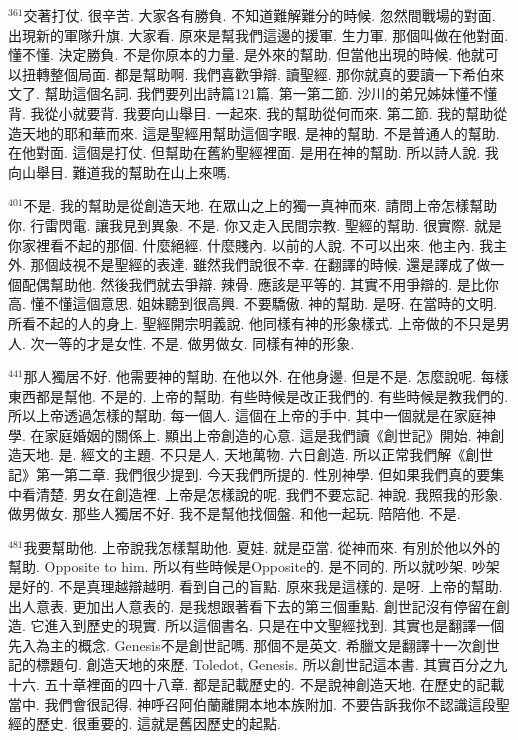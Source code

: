 \documentclass{book}
\begin{document}
$^{361}$交著打仗.
很辛苦.
大家各有勝負.
不知道難解難分的時候.
忽然間戰場的對面.
出現新的軍隊升旗.
大家看.
原來是幫我們這邊的援軍.
生力軍.
那個叫做在他對面.
懂不懂.
決定勝負.
不是你原本的力量.
是外來的幫助.
但當他出現的時候.
他就可以扭轉整個局面.
都是幫助啊.
我們喜歡爭辯.
讀聖經.
那你就真的要讀一下希伯來文了.
幫助這個名詞.
我們要列出詩篇121篇.
第一第二節.
沙川的弟兄姊妹懂不懂背.
我從小就要背.
我要向山舉目.
一起來.
我的幫助從何而來.
第二節.
我的幫助從造天地的耶和華而來.
這是聖經用幫助這個字眼.
是神的幫助.
不是普通人的幫助.
在他對面.
這個是打仗.
但幫助在舊約聖經裡面.
是用在神的幫助.
所以詩人說.
我向山舉目.
難道我的幫助在山上來嗎.

$^{401}$不是.
我的幫助是從創造天地.
在眾山之上的獨一真神而來.
請問上帝怎樣幫助你.
行雷閃電.
讓我見到異象.
不是.
你又走入民間宗教.
聖經的幫助.
很實際.
就是你家裡看不起的那個.
什麼絕經.
什麼賤內.
以前的人說.
不可以出來.
他主內.
我主外.
那個歧視不是聖經的表達.
雖然我們說很不幸.
在翻譯的時候.
還是譯成了做一個配偶幫助他.
然後我們就去爭辯.
辣骨.
應該是平等的.
其實不用爭辯的.
是比你高.
懂不懂這個意思.
姐妹聽到很高興.
不要驕傲.
神的幫助.
是呀.
在當時的文明.
所看不起的人的身上.
聖經開宗明義說.
他同樣有神的形象樣式.
上帝做的不只是男人.
次一等的才是女性.
不是.
做男做女.
同樣有神的形象.

$^{441}$那人獨居不好.
他需要神的幫助.
在他以外.
在他身邊.
但是不是.
怎麼說呢.
每樣東西都是幫他.
不是的.
上帝的幫助.
有些時候是改正我們的.
有些時候是教我們的.
所以上帝透過怎樣的幫助.
每一個人.
這個在上帝的手中.
其中一個就是在家庭神學.
在家庭婚姻的關係上.
顯出上帝創造的心意.
這是我們讀《創世記》開始.
神創造天地.
是.
經文的主題.
不只是人.
天地萬物.
六日創造.
所以正常我們解《創世記》第一第二章.
我們很少提到.
今天我們所提的.
性別神學.
但如果我們真的要集中看清楚.
男女在創造裡.
上帝是怎樣說的呢.
我們不要忘記.
神說.
我照我的形象.
做男做女.
那些人獨居不好.
我不是幫他找個盤.
和他一起玩.
陪陪他.
不是.

$^{481}$我要幫助他.
上帝說我怎樣幫助他.
夏娃.
就是亞當.
從神而來.
有別於他以外的幫助.
Opposite to him.
所以有些時候是Opposite的.
是不同的.
所以就吵架.
吵架是好的.
不是真理越辯越明.
看到自己的盲點.
原來我是這樣的.
是呀.
上帝的幫助.
出人意表.
更加出人意表的.
是我想跟著看下去的第三個重點.
創世記沒有停留在創造.
它進入到歷史的現實.
所以這個書名.
只是在中文聖經找到.
其實也是翻譯一個先入為主的概念.
Genesis不是創世記嗎.
那個不是英文.
希臘文是翻譯十一次創世記的標題句.
創造天地的來歷.
Toledot, Genesis.
所以創世記這本書.
其實百分之九十六.
五十章裡面的四十八章.
都是記載歷史的.
不是說神創造天地.
在歷史的記載當中.
我們會很記得.
神呼召阿伯蘭離開本地本族附加.
不要告訴我你不認識這段聖經的歷史.
很重要的.
這就是舊因歷史的起點.
\end{document}
